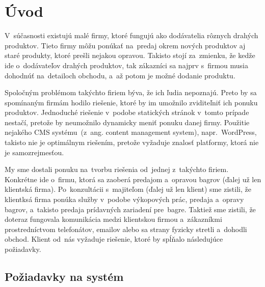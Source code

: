 \chapter{Úvod}

V~súčasnosti existujú malé firmy, ktoré fungujú ako dodávatelia rôznych drahých produktov. Tieto firmy môžu ponúkať na~predaj okrem nových produktov aj staré produkty, ktoré prešli nejakou opravou. Takisto stojí za~zmienku, že kedže ide o~dodávateľov drahých produktov, tak zákazníci sa najprv s~firmou musia dohodnúť na~detailoch obchodu, a~až potom je možné dodanie produktu.

Spoločným problémom takýchto firiem býva, že ich ľudia nepoznajú. Preto by sa spomínaným firmám hodilo riešenie, ktoré by im umožnilo zviditeľniť ich ponuku produktov. Jednoduché riešenie v~podobe statických stránok v~tomto prípade nestačí, pretože by neumožnilo dynamicky meniť ponuku danej firmy. Použitie nejakého CMS systému~(z~ang. content management system), napr.~Word\-Press, takisto nie je optimálnym riešením, pretože vyžaduje znalosť platformy, ktorá nie je samozrejmesťou.

My sme dostali ponuku na~tvorbu riešenia od~jednej z~takýchto firiem. Konkrétne ide o~firmu, ktorá sa zaoberá predajom a~opravou bagrov (ďalej už len klientská firma). Po~konzultácii s~majiteľom (ďalej už len klient) sme zistili, že klientksá firma ponúka služby v~podobe výkopových prác, predaja a~opravy bagrov, a~takisto predaja prídavných zariadení pre~bagre. Taktiež sme zistili, že doteraz fungovala komunikácia medzi klientskou firmou a~zákazníkmi prostredníctvom telefonátov, emailov alebo sa strany fyzicky stretli a~dohodli obchod. Klient od~nás vyžaduje riešenie, ktoré by spĺňalo následujúce požiadavky.

\section{Požiadavky na systém}

